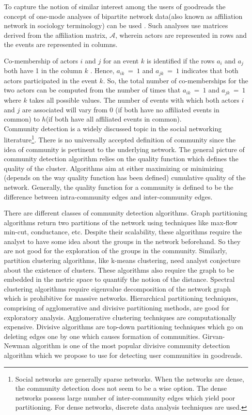 \documentclass[11pt]{article}
\begin{document}
To capture the notion of similar interest among the users of goodreads  the concept of one-mode analyses of bipartite network data(also known as affiliation network in sociology terminology) can be used \cite{wasserman}. Such analyses use matrices derived from the affiliation matrix, $\mathcal{A}$, wherein actors are represented in rows and the events are represented in columns.

Co-membership of actors $i$ and $j$ for an event $k$ is identified if the rows $a_i$ and $a_j$ both have 1 in the column $k$ .
Hence,  $a_{ik}~=~1$ and $a_{jk}~=~1$ indicates that both actors participated in the event $k$. So, the total number of co-memberships for the two actors can be computed from the number of times that $a_{ik}~=~1$ and $a_{jk}~=~1$ where $k$ takes all possible values. The number of events with which both actors $i$ and $j$ are associated will vary from 0 (if both have no affiliated events in common) to $h$(if both have all affiliated events in common).\\

Community detection is a widely discussed topic in the social networking literature\footnote{Social networks are generally sparse networks. When the networks are dense, the community detection does not seem to be a wise option. The dense networks possess large number of inter-community edges which yield poor partitioning. For dense networks, discrete data analysis techniques are used.}\cite{clauset}.
There is no universally accepted definition of community since the idea of community is pertinent to the underlying network.
The general picture of community detection algorithm relies on the quality function which defines the quality of the cluster.
Algorithms aim at either maximizing or minimizing (depends on the way quality function has been defined) cumulative quality of the network.
Generally, the quality function for a community is defined to be the difference between intra-community edges and inter-community edges.

There are different classes of community detection algorithms.
Graph partitioning algorithms return two partitions of the network using techniques like max-flow min-cut, conductance, etc.
Despite their scalability, these algorithms require the analyst to have some idea about the groups in the network beforehand.
So they are not good for the exploration of the groups in the community.
Similarly, partition clustering algorithms, like k-means clustering, need analyst conjecture about the existence of clusters.
These algorithms also require the graph to be embedded in the metric space to quantify the notion of the distance.
Spectral clustering algorithms require eigenvalue decomposition of the network graph which is prohibitive for massive networks.
Hierarchical partitioning techniques, comprising of agglomerative and divisive partitioning methods, are good for exploratory analysis.
Agglomerative clustering techniques are computationally expensive. Divisive algorithms are top-down partitioning techniques which go on deleting edges one by one which causes formation of communities. Girvan-Newman algorithm is one of the most popular divisive community detection algorithm which we propose to use for detecting user communities in goodreads.
\end{document}

